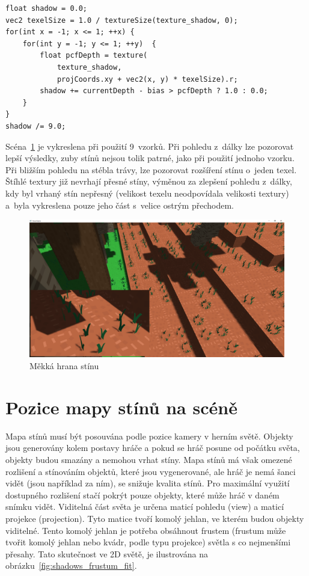 \documentclass[thesis=M,czech]{FITthesis}[2019/12/23]
\begin{document}
\begin{verbatim}
float shadow = 0.0;
vec2 texelSize = 1.0 / textureSize(texture_shadow, 0);
for(int x = -1; x <= 1; ++x) {
    for(int y = -1; y <= 1; ++y)  {
        float pcfDepth = texture(
            texture_shadow,
            projCoords.xy + vec2(x, y) * texelSize).r;
        shadow += currentDepth - bias > pcfDepth ? 1.0 : 0.0;        
    }    
}
shadow /= 9.0;
\end{verbatim}

Scéna~\ref{fig:shadows_pcf_soft} je vykreslena při použití 9~vzorků. Při pohledu z~dálky lze pozorovat lepší výsledky, zuby stínů nejsou tolik patrné, jako při použití jednoho vzorku. Při bližším pohledu na stébla trávy, lze pozorovat rozšíření stínu o~jeden texel. Štíhlé textury již nevrhají přesné stíny, výměnou za zlepšení pohledu z~dálky, kdy byl vrhaný stín nepřesný (velikost texelu neodpovídala velikosti textury) a~byla vykreslena pouze jeho část s~velice ostrým přechodem.

\begin{figure}\centering
	\includegraphics[width=\textwidth]{images/shadows/pcf_soft}
	\caption[Měkká hrana stínu]{Měkká hrana stínu}\label{fig:shadows_pcf_soft}
\end{figure}

\section{Pozice mapy stínů na scéně}

Mapa stínů musí být posouvána podle pozice kamery v herním světě. Objekty jsou generovány kolem postavy hráče a pokud se hráč posune od počátku světa, objekty budou smazány a nemohou vrhat stíny. Mapa stínů má však omezené rozlišení a stínováním objektů, které jsou vygenerované, ale hráč je nemá šanci vidět (jsou například za ním), se snižuje kvalita stínů. Pro maximální využití dostupného rozlišení stačí pokrýt pouze objekty, které může hráč v daném snímku vidět. Viditelná část světa je určena maticí pohledu (view) a maticí projekce (projection). Tyto matice tvoří komolý jehlan, ve kterém budou objekty viditelné. Tento komolý jehlan je potřeba obsáhnout frustem (frustum může tvořit komolý jehlan nebo kvádr, podle typu projekce) světla s co nejmenšími přesahy. Tato skutečnost ve 2D světě, je ilustrována na obrázku~\ref{fig:shadows_frustum_fit}.
\end{document}
